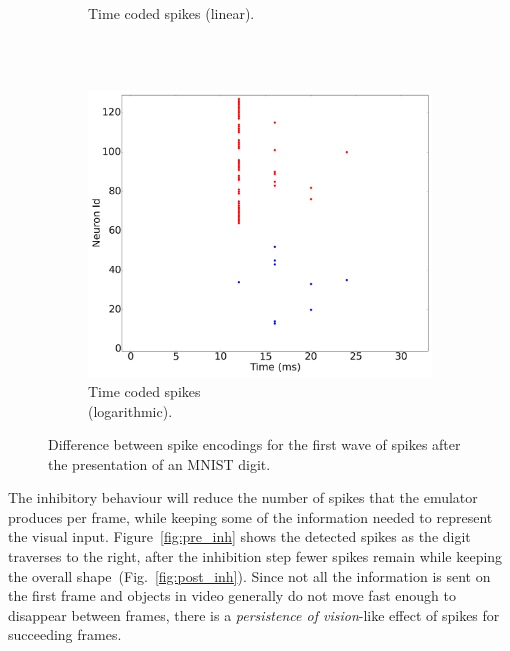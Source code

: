 \documentclass[conference]{IEEEtran}
\begin{document}
\begin{figure}[htb]
\begin{subfigure}[b]{0.3\textwidth}
    \caption{Time coded spikes (linear).\\~}
    \label{fig:time_spikes}
  \end{subfigure}~
  \begin{subfigure}[b]{0.3\textwidth}
    \includegraphics[width=\textwidth]{time_exp_coded_-8x8-_cycle_0}
    \caption{Time coded spikes \\(logarithmic).}
    \label{fig:time_exp_spikes}
  \end{subfigure}
  
  \caption{Difference between spike encodings for the first wave of spikes after the presentation of an MNIST digit.}
  \label{fig:spike_codes}
\end{figure}


The inhibitory behaviour will reduce the number of spikes that the emulator produces per frame, while keeping some of the information needed to represent the visual input. Figure~\ref{fig:pre_inh} shows the detected spikes as the digit traverses to the right, after the inhibition step fewer spikes remain while keeping the overall shape~(Fig.~\ref{fig:post_inh}). Since not all the information is sent on the first frame and objects in video generally do not move fast enough to disappear between frames, there is a \textit{persistence of vision}-like effect of spikes for succeeding frames.
\end{document}
